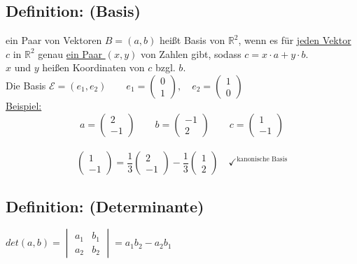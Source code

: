\subsection{Definition: (Basis)}
ein Paar von Vektoren $B=(a,b)$ heißt Basis von $\mathbb{R}^{2}$, wenn es für \underline{jeden Vektor} $c$ in $\mathbb{R}^{2}$ genau \underline{ein Paar $(x,y)$} von Zahlen gibt, sodass $c=x\cdot a + y \cdot b$. \\
$x$ und $y$ heißen Koordinaten von $c$ bzgl. $b$.\\
Die Basis $\mathcal{E}=(e_{1},e_{2}) \qquad e_{1}=\begin{pmatrix} 0 \\ 1 \end{pmatrix}, \quad e_{2} = \begin{pmatrix} 1 \\ 0 \end{pmatrix}$\\
\underline{Beispiel: }\\
\begin{equation*}
a = \begin{pmatrix} 2 \\ -1 \end{pmatrix} \qquad b = \begin{pmatrix} -1 \\ 2 \end{pmatrix} \qquad c =\begin{pmatrix} 1 \\ -1 \end{pmatrix}
\end{equation*}\\
\begin{equation*}
\begin{pmatrix} 1 \\ -1\end{pmatrix} = \frac{1}{3} \begin{pmatrix} 2 \\ -1 \end{pmatrix} - \frac{1}{3} \begin{pmatrix} 1 \\ 2 \end{pmatrix} \quad \checkmark^{\textrm{kanonische Basis}}
\end{equation*}
%
%
%
%
\subsection{Definition: (Determinante)}
$det(a,b) = \begin{vmatrix} a_{1} & b_{1} \\ a_{2} & b_{2} \end{vmatrix}=a_{1}b_{2}-a_{2}b_{1}$
%
%
%
%
%
%
